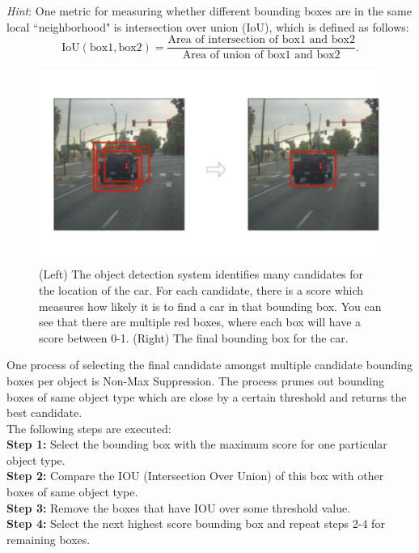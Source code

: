 \documentclass[answers]{exam}
\begin{document}
\emph{Hint}: One metric for measuring whether different bounding boxes are in the same local ``neighborhood" is intersection over union (IoU), which is defined as follows:
\begin{equation*}
\text{IoU}(\text{box1}, \text{box2}) = \frac{\text{Area of intersection of box1 and box2}}{\text{Area of union of box1 and box2}}.
\end{equation*}

\begin{figure}[H]
    \centering
    \includegraphics[width=\linewidth]{Images/interview.pdf}
\caption{(Left) The object detection system identifies many candidates for the location of the car. For each candidate, there is a score which measures how likely it is to find a car in that bounding box. You can see that there are multiple red boxes, where each box will have a score between 0-1. (Right) The final bounding box for the car.}
\label{interview}
\end{figure}

\begin{solution}
One process of selecting the final candidate amongst multiple candidate bounding boxes per object is Non-Max Suppression. The process prunes out bounding boxes of same object type which are close by a certain threshold and returns the best candidate.\\
The following steps are executed:\\
\textbf{Step 1:} Select the bounding box with the maximum score for one particular object type.\\
\textbf{Step 2:} Compare the IOU (Intersection Over Union) of this box with other boxes of same object type.\\
\textbf{Step 3:} Remove the boxes that have IOU over some threshold value.\\
\textbf{Step 4:} Select the next highest score bounding box and repeat steps 2-4 for remaining boxes.\\

\end{solution}
\end{document}
